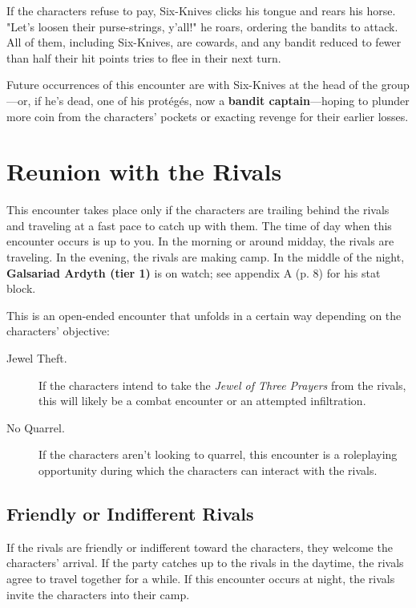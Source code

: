 \documentclass[a4paper, 11pt, bg=full, twocolumn, nooutline]{dndbook}
\begin{document}
If the characters refuse to pay, Six-Knives clicks his tongue and rears his horse. "Let's loosen their purse-strings, y'all!" he roars, ordering the bandits to attack. All of them, including Six-Knives, are cowards, and any bandit reduced to fewer than half their hit points tries to flee in their next turn.

Future occurrences of this encounter are with Six-Knives at the head of the group---or, if he's dead, one of his protégés, now a \textbf{bandit captain}---hoping to plunder more coin from the characters' pockets or exacting revenge for their earlier losses.
\section{Reunion with the Rivals}


This encounter takes place only if the characters are trailing behind the rivals and traveling at a fast pace to catch up with them. The time of day when this encounter occurs is up to you. In the morning or around midday, the rivals are traveling. In the evening, the rivals are making camp. In the middle of the night, \textbf{Galsariad Ardyth (tier 1)} is on watch; see appendix A (p. 8) for his stat block.

This is an open-ended encounter that unfolds in a certain way depending on the characters' objective:

\begin{description}
\item[Jewel Theft.] If the characters intend to take the \textit{Jewel of Three Prayers} from the rivals, this will likely be a combat encounter or an attempted infiltration.
\item[No Quarrel.] If the characters aren't looking to quarrel, this encounter is a roleplaying opportunity during which the characters can interact with the rivals.
\end{description}

\subsection{Friendly or Indifferent Rivals}

If the rivals are friendly or indifferent toward the characters, they welcome the characters' arrival. If the party catches up to the rivals in the daytime, the rivals agree to travel together for a while. If this encounter occurs at night, the rivals invite the characters into their camp.
\end{document}
